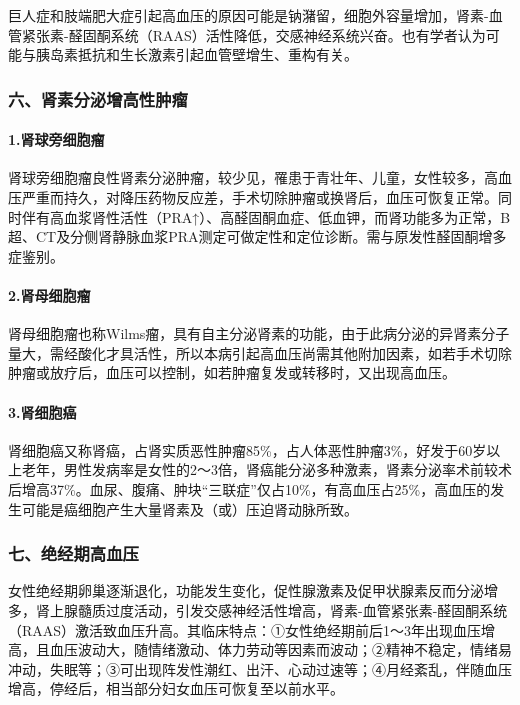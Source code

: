 巨人症和肢端肥大症引起高血压的原因可能是钠潴留，细胞外容量增加，肾素-血管紧张素-醛固酮系统（RAAS）活性降低，交感神经系统兴奋。也有学者认为可能与胰岛素抵抗和生长激素引起血管壁增生、重构有关。

\subsubsection{六、肾素分泌增高性肿瘤}

\paragraph{1.肾球旁细胞瘤}

肾球旁细胞瘤良性肾素分泌肿瘤，较少见，罹患于青壮年、儿童，女性较多，高血压严重而持久，对降压药物反应差，手术切除肿瘤或换肾后，血压可恢复正常。同时伴有高血浆肾性活性（PRA↑）、高醛固酮血症、低血钾，而肾功能多为正常，B超、CT及分侧肾静脉血浆PRA测定可做定性和定位诊断。需与原发性醛固酮增多症鉴别。

\paragraph{2.肾母细胞瘤}

肾母细胞瘤也称Wilms瘤，具有自主分泌肾素的功能，由于此病分泌的异肾素分子量大，需经酸化才具活性，所以本病引起高血压尚需其他附加因素，如若手术切除肿瘤或放疗后，血压可以控制，如若肿瘤复发或转移时，又出现高血压。

\paragraph{3.肾细胞癌}

肾细胞癌又称肾癌，占肾实质恶性肿瘤85\%，占人体恶性肿瘤3\%，好发于60岁以上老年，男性发病率是女性的2～3倍，肾癌能分泌多种激素，肾素分泌率术前较术后增高37\%。血尿、腹痛、肿块“三联症”仅占10\%，有高血压占25\%，高血压的发生可能是癌细胞产生大量肾素及（或）压迫肾动脉所致。

\subsubsection{七、绝经期高血压}

女性绝经期卵巢逐渐退化，功能发生变化，促性腺激素及促甲状腺素反而分泌增多，肾上腺髓质过度活动，引发交感神经活性增高，肾素-血管紧张素-醛固酮系统（RAAS）激活致血压升高。其临床特点：①女性绝经期前后1～3年出现血压增高，且血压波动大，随情绪激动、体力劳动等因素而波动；②精神不稳定，情绪易冲动，失眠等；③可出现阵发性潮红、出汗、心动过速等；④月经紊乱，伴随血压增高，停经后，相当部分妇女血压可恢复至以前水平。

